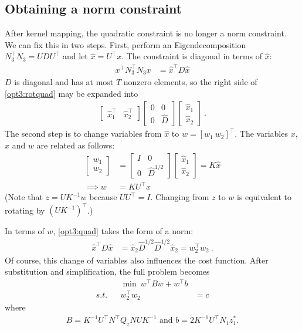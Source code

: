 \documentclass[conference]{IEEEtran}
\begin{document}
\subsection{Obtaining a norm constraint}

After kernel mapping, the quadratic constraint is no longer a norm constraint. We can fix this in two steps. First, perform an Eigendecomposition $N_3^\top N_3 = UDU^\top$ and let $\hat{x} = U^\top x$. The constraint is diagonal in terms of $\hat{x}$:
\begin{align}
\label{opt3:rotquad} x^\top N_3^\top N_3 x &= \hat{x}^\top D\hat{x}
\end{align}
$D$ is diagonal and has at most $T$ nonzero elements, so the right side of \eqref{opt3:rotquad} may be expanded into
\begin{align}
\begin{bmatrix}
\hat{x}_1^\top & \hat{x}_2^\top \end{bmatrix}
\begin{bmatrix} 0 & 0 \\ 0 & \hat{D} \end{bmatrix}
\begin{bmatrix}
\hat{x}_1 \\ \hat{x}_2
\end{bmatrix}~.
\end{align}
The second step is to change variables from $\hat{x}$ to $w = [w_1~w_2]^\top$. The variables $x$, $\hat{x}$ and $w$ are related as follows:
\begin{align}
\label{eq:x_to_w} \begin{bmatrix} w_1 \\ w_2 \end{bmatrix} &=
\begin{bmatrix} I & 0 \\ 0 & \hat{D}^{1/2} \end{bmatrix}
\begin{bmatrix} \hat{x}_1 \\ \hat{x}_2 \end{bmatrix} = K\hat{x} \\
\nonumber \implies w &= KU^\top x
\end{align}
(Note that $z = UK^{-1}w$ because $UU^\top = I$. Changing from $z$ to $w$
is equivalent to rotating by $(UK^{-1})^\top$.)

In terms of $w$, \eqref{opt3:quad} takes the form of a norm:
\begin{align}
\hat{x}^\top D\hat{x} &= \hat{x}_2\hat{D}^{1/2}\hat{D}^{1/2}\hat{x}_2 = w_2^\top w_2~.
\end{align}
Of course, this change of variables also influences the cost function. After substitution and simplification, the full problem becomes
\begin{subequations}\label{opt4}
\begin{align}
\label{opt4:obj} && \min~ w^\top Bw + w^\top b \\
\label{opt4:quad} s.t. && w_2^\top w_2 &= c
\end{align}
\end{subequations}
where 
\begin{align*}
B= K^{-1}U^\top N^\top Q_z NUK^{-1} \text{ and }b=2 K^{-1}U^\top N_1z_1^*.
\end{align*}
\end{document}
